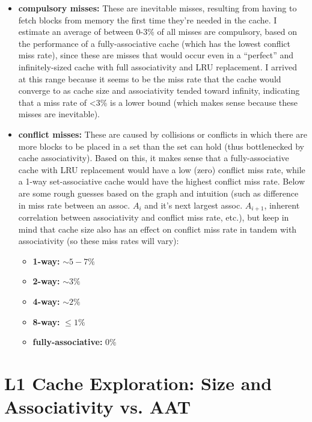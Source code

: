 \documentclass{article}
\begin{document}
    \begin{itemize}
        \item \textbf{compulsory misses:} These are inevitable misses, resulting from having to fetch blocks from 
        memory the first time they're needed in the cache. I estimate an average of between 0-3\% of all misses are compulsory, 
        based on the performance of a fully-associative cache (which has the lowest conflict miss rate), since these are misses that would occur even in a ``perfect'' and 
        infinitely-sized cache with full associativity and LRU replacement. I arrived at this range because it seems 
        to be the miss rate that the cache would converge to as cache size and associativity tended toward infinity, 
        indicating that a miss rate of \textless3\% is a lower bound (which makes sense because these misses are inevitable).

        \item \textbf{conflict misses:} These are caused by collisions or conflicts in which there are more blocks to 
        be placed in a set than the set can hold (thus bottlenecked by cache associativity). Based on this, it makes sense 
        that a fully-associative cache with LRU replacement would have a low (zero) conflict miss rate, while a 1-way 
        set-associative cache would have the highest conflict miss rate. Below are some rough guesses based on the graph 
        and intuition (such as difference in miss rate between an assoc. $A_i$ and it's next largest assoc. $A_{i+1}$, 
        inherent correlation between associativity and conflict miss rate, etc.), but keep in mind that cache size also has an 
        effect on conflict miss rate in tandem with associativity (so these miss rates will vary):

        \begin{itemize}
            \item \textbf{1-way:} $\sim 5-7\%$
            \item \textbf{2-way:} $\sim 3\%$
            \item \textbf{4-way:} $\sim 2\%$
            \item \textbf{8-way:} $\leq 1\%$
            \item \textbf{fully-associative:} 0\%
        \end{itemize}

    \end{itemize}

    \newpage

    \section{L1 Cache Exploration: Size and Associativity vs. AAT}
\end{document}
